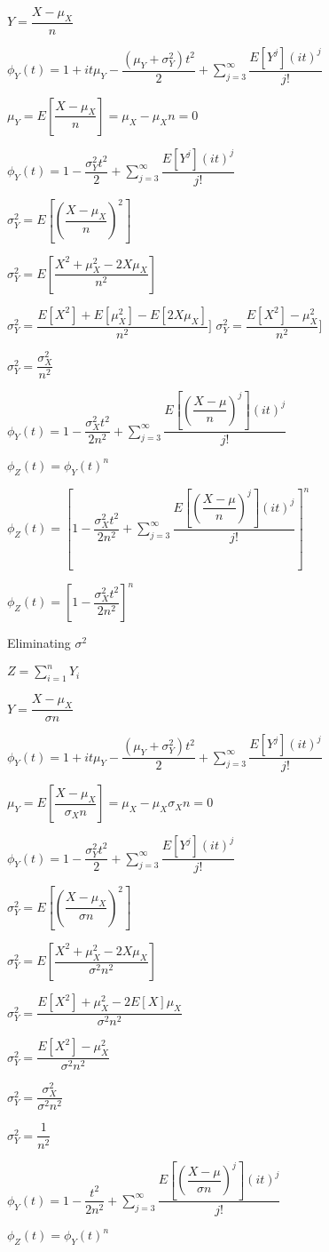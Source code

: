 \(Y=\dfrac{X-\mu_X }{n}\)

\(\phi_Y(t)=1+it\mu_Y -\dfrac{(\mu_Y +\sigma_Y^2 )t^2}{2} +\sum_{j=3}^{\infty }\dfrac{E[Y^j](it)^j}{j!}\)

\(\mu_Y =E[\dfrac{X-\mu_X }{n}] ={\mu_X -\mu_X }{n}=0\)

\(\phi_Y(t)=1-\dfrac{\sigma_Y^2t^2}{2} +\sum_{j=3}^{\infty }\dfrac{E[Y^j](it)^j}{j!}\)

\(\sigma^2_Y =E[(\dfrac{X-\mu_X }{n})^2]\)

\(\sigma^2_Y =E[\dfrac{X^2+\mu^2_X-2X\mu_X }{n^2}]\)

\(\sigma^2_Y =\dfrac{E[X^2]+E[\mu^2_X]-E[2X\mu_X] }{n^2}]\)
\(\sigma^2_Y =\dfrac{E[X^2]-\mu^2_X}{n^2}]\)

\(\sigma^2_Y =\dfrac{\sigma^2_X}{n^2}\)

\(\phi_Y(t)=1-\dfrac{\sigma_X^2t^2}{2n^2} +\sum_{j=3}^{\infty }\dfrac{E[(\dfrac{X-\mu}{n})^j](it)^j}{j!}\)

\(\phi_Z(t)=\phi_Y(t)^n\)

\(\phi_Z(t)=[1-\dfrac{\sigma_X^2t^2}{2n^2} +\sum_{j=3}^{\infty }\dfrac{E[(\dfrac{X-\mu}{n})^j](it)^j}{j!}]^n\)

\(\phi_Z(t)=[1-\dfrac{\sigma_X^2t^2}{2n^2}]^n\)

Eliminating \(\sigma^2 \)

\(Z=\sum_{i=1}^nY_i\)

\(Y=\dfrac{X-\mu_X }{\sigma n}\)

\(\phi_Y(t)=1+it\mu_Y -\dfrac{(\mu_Y +\sigma_Y^2 )t^2}{2} +\sum_{j=3}^{\infty }\dfrac{E[Y^j](it)^j}{j!}\)

\(\mu_Y =E[\dfrac{X-\mu_X }{\sigma_X n}] ={\mu_X -\mu_X }{\sigma_X n}=0\)

\(\phi_Y(t)=1-\dfrac{\sigma_Y^2t^2}{2} +\sum_{j=3}^{\infty }\dfrac{E[Y^j](it)^j}{j!}\)

\(\sigma^2_Y =E[(\dfrac{X-\mu_X }{\sigma n})^2]\)

\(\sigma^2_Y =E[\dfrac{X^2+\mu^2_X-2X\mu_X }{\sigma^2 n^2}]\)

\(\sigma^2_Y =\dfrac{E[X^2]+\mu^2_X-2E[X]\mu_X }{\sigma^2 n^2}\)

\(\sigma^2_Y =\dfrac{E[X^2]-\mu^2_X}{\sigma^2 n^2}\)

\(\sigma^2_Y =\dfrac{\sigma^2_X}{\sigma^2 n^2}\)

\(\sigma^2_Y =\dfrac{1}{n^2}\)

\(\phi_Y(t)=1-\dfrac{t^2}{2n^2} +\sum_{j=3}^{\infty }\dfrac{E[(\dfrac{X-\mu}{\sigma n})^j](it)^j}{j!}\)

\(\phi_Z(t)=\phi_Y(t)^n\)

